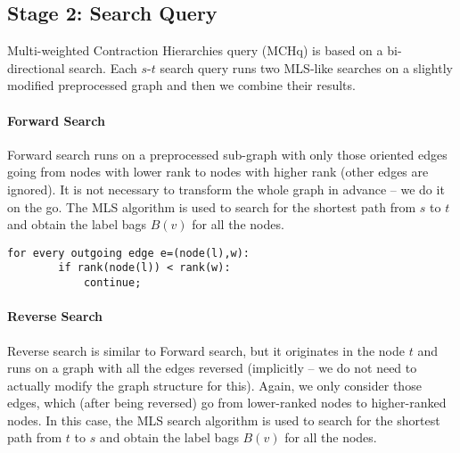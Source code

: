 
\subsection{Stage 2: Search Query}
\label{subsecStage2}

Multi-weighted Contraction Hierarchies query (MCHq) is based on a bi-directional search.
Each $s$-$t$ search query runs two MLS-like searches on a slightly modified preprocessed graph
and then we combine their results. 

\paragraph*{Forward Search}
Forward search runs on a preprocessed sub-graph with only those oriented edges going from nodes with lower rank to nodes with higher rank (other edges are ignored). It is not necessary to transform the whole graph in advance -- we do it on the go. 
The MLS algorithm is used to search for the shortest path from $s$ to $t$ and obtain the label bags $B(v)$ for all the nodes.

\begin{lstlisting}[caption={Forward Search},label=list:8-6,captionpos=t,float,abovecaptionskip=-\medskipamount]
    for every outgoing edge e=(node(l),w):
    	if rank(node(l)) < rank(w):
        	continue;
\end{lstlisting}

\paragraph*{Reverse Search}
Reverse search is similar to Forward search, but it originates in the node $t$ and runs on a graph with all the edges reversed (implicitly -- we do not need to actually modify the graph structure for this). Again, we only consider those edges, which (after being reversed) go from lower-ranked nodes to higher-ranked nodes. 
In this case, the MLS search algorithm is used to search for the shortest path from $t$ to $s$ and obtain the label bags $B(v)$ for all the nodes.

